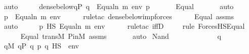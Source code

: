 \begin{isabellebody}
\ auto\isanewline
\ \ \isamarkupfalse%
\ \isamarkupfalse%
\ {\isachardoublequoteopen}dense{\isacharunderscore}{\kern0pt}below{\isacharparenleft}{\kern0pt}{\isacharbraceleft}{\kern0pt}q{\isasymin}P{\isachardot}{\kern0pt}\ {\isacharparenleft}{\kern0pt}q\ {\isasymtturnstile}\ {\isacharparenleft}{\kern0pt}Equal{\isacharparenleft}{\kern0pt}n{\isacharcomma}{\kern0pt}\ m{\isacharparenright}{\kern0pt}{\isacharparenright}{\kern0pt}\ env{\isacharparenright}{\kern0pt}{\isacharbraceright}{\kern0pt}{\isacharcomma}{\kern0pt}\ p{\isacharparenright}{\kern0pt}{\isachardoublequoteclose}\ \isanewline
\ \ \ \ \isamarkupfalse%
\ Equal\ \isanewline
\ \ \ \ \isamarkupfalse%
\ auto\isanewline
\ \ \isamarkupfalse%
\ \isamarkupfalse%
\ {\isachardoublequoteopen}p\ {\isasymtturnstile}\ Equal{\isacharparenleft}{\kern0pt}n{\isacharcomma}{\kern0pt}\ m{\isacharparenright}{\kern0pt}\ env{\isachardoublequoteclose}\ \isanewline
\ \ \ \ \isamarkupfalse%
{\isacharparenleft}{\kern0pt}rule{\isacharunderscore}{\kern0pt}tac\ dense{\isacharunderscore}{\kern0pt}below{\isacharunderscore}{\kern0pt}imp{\isacharunderscore}{\kern0pt}forces{\isacharparenright}{\kern0pt}\isanewline
\ \ \ \ \isamarkupfalse%
\ Equal\ assms\isanewline
\ \ \ \ \isamarkupfalse%
\ auto\isanewline
\ \ \isamarkupfalse%
\ \isamarkupfalse%
\ {\isachardoublequoteopen}p\ {\isasymtturnstile}HS\ Equal{\isacharparenleft}{\kern0pt}n{\isacharcomma}{\kern0pt}\ m{\isacharparenright}{\kern0pt}\ env{\isachardoublequoteclose}\ \isanewline
\ \ \ \ \isamarkupfalse%
{\isacharparenleft}{\kern0pt}rule{\isacharunderscore}{\kern0pt}tac\ iffD{}{\isacharparenright}{\kern0pt}\isanewline
\ \ \ \ \isamarkupfalse%
{\isacharparenleft}{\kern0pt}rule\ ForcesHS{\isacharunderscore}{\kern0pt}Equal{\isacharparenright}{\kern0pt}\isanewline
\ \ \ \ \isamarkupfalse%
\ Equal\ transM\ P{\isacharunderscore}{\kern0pt}in{\isacharunderscore}{\kern0pt}M\ assms\ \isanewline
\ \ \ \ \isamarkupfalse%
\ auto\isanewline
{}\isamarkupfalse%
\isanewline
{}\isamarkupfalse%
\ {\isacharparenleft}{\kern0pt}Nand\ {\isasymphi}\ {\isasympsi}{\isacharparenright}{\kern0pt}\isanewline
\ \ \isacommand{{\isacharbraceleft}{\kern0pt}}\isamarkupfalse%
\ \ \isanewline
\ \ \ \ \isamarkupfalse%
\ q\isanewline
\ \ \ \ \isamarkupfalse%
\ {\isachardoublequoteopen}q{\isasymin}M{\isachardoublequoteclose}\ {\isachardoublequoteopen}q{\isasymin}P{\isachardoublequoteclose}\ {\isachardoublequoteopen}q{\isasympreceq}\ p{\isachardoublequoteclose}\ {\isachardoublequoteopen}q\ {\isasymtturnstile}HS\ {\isasymphi}\ env{\isachardoublequoteclose}\isanewline

\end{isabellebody}
